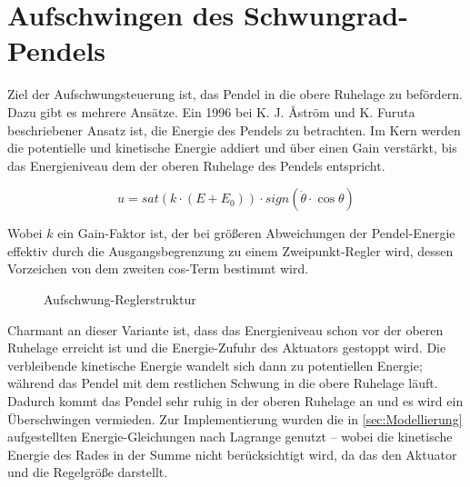 \pagestyle{cyrill}
\section{Aufschwingen des Schwungrad-Pendels} \label{sec:aufschwingen}

Ziel der Aufschwungsteuerung ist, das Pendel in die obere Ruhelage zu befördern. Dazu gibt es mehrere Ansätze.
Ein 1996 bei K. J. Åström und K. Furuta \cite{SwingUp} beschriebener Ansatz ist, die Energie des Pendels zu betrachten. Im Kern werden die potentielle und kinetische Energie addiert und über einen Gain verstärkt, bis das Energieniveau dem der oberen Ruhelage des Pendels entspricht.

\begin{equation} \label{eq:Gleichung6.1}
    u = sat ( k \cdot( E + E_{\mathrm{0}} ) ) \cdot sign (\dot\theta \cdot\cos{\theta})
\end{equation}
\newline

Wobei $k$ ein Gain-Faktor ist, der bei größeren Abweichungen der Pendel-Energie effektiv durch die Ausgangsbegrenzung zu einem Zweipunkt-Regler wird, dessen Vorzeichen von dem zweiten cos-Term bestimmt wird.

\begin{figure}[H]
   \centering
   \caption[Aufschwung-Reglerstruktur]{Aufschwung-Reglerstruktur}
   \label{fig:Bild6.1}
\end{figure}

Charmant an dieser Variante ist, dass das Energieniveau schon vor der oberen Ruhelage erreicht ist und die Energie-Zufuhr des Aktuators gestoppt wird. Die verbleibende kinetische Energie wandelt sich dann zu potentiellen Energie; während das Pendel mit dem restlichen Schwung in die obere Ruhelage läuft. Dadurch kommt das Pendel sehr ruhig in der oberen Ruhelage an und es wird ein Überschwingen vermieden.
Zur Implementierung wurden die in \autoref{sec:Modellierung} aufgestellten Energie-Gleichungen nach Lagrange genutzt – wobei die kinetische Energie des Rades in der Summe nicht berücksichtigt wird, da das den Aktuator und die Regelgröße darstellt.

